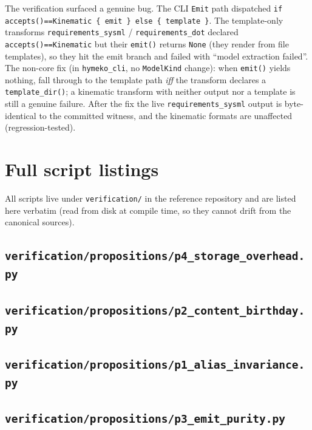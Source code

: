 \documentclass[11pt]{article}
\theoremstyle{definition}
\begin{document}
The verification surfaced a genuine bug. The CLI \texttt{Emit} path dispatched
\texttt{if accepts()==Kinematic \{ emit \} else \{ template \}}. The template-only transforms
\texttt{requirements\_sysml} / \texttt{requirements\_dot} declared \texttt{accepts()==Kinematic} but their
\texttt{emit()} returns \texttt{None} (they render from file templates), so they hit the emit branch and failed
with ``model extraction failed''. The non-core fix (in \texttt{hymeko\_cli}, no \texttt{ModelKind} change): when
\texttt{emit()} yields nothing, fall through to the template path \emph{iff} the transform declares a
\texttt{template\_dir()}; a kinematic transform with neither output nor a template is still a genuine failure.
After the fix the live \texttt{requirements\_sysml} output is byte-identical to the committed witness, and the
kinematic formats are unaffected (regression-tested).

\appendix
\section{Full script listings}
\label{app:listings}

All scripts live under \texttt{verification/} in the reference repository and are listed here verbatim (read from
disk at compile time, so they cannot drift from the canonical sources).

\subsection{\texttt{verification/propositions/p4\_storage\_overhead.py}}

\subsection{\texttt{verification/propositions/p2\_content\_birthday.py}}

\subsection{\texttt{verification/propositions/p1\_alias\_invariance.py}}

\subsection{\texttt{verification/propositions/p3\_emit\_purity.py}}

\end{document}
